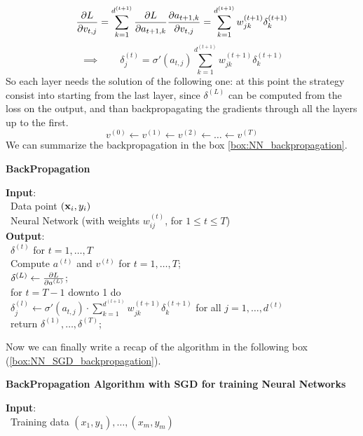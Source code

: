 \documentclass[12pt]{report}
\theoremstyle{plain}
\begin{document}
\begin{flushleft}
\[ \pdv{L}{v_{t,j}}=\sum_{k=1}^{d^{(t+1)}}\pdv{L}{a_{t+1,k}}\pdv{a_{t+1,k}}{v_{t,j}} = \sum_{k=1}^{d^{(t+1)}}w_{jk}^{(t+1)}\delta_k^{(t+1)} \]
\[ \implies\qquad\delta_j^{(t)}=\sigma'(a_{t,j})\sum_{k=1}^{d^{(t+1)}}w_{jk}^{(t+1)}\delta_k^{(t+1)} \]
So each layer needs the solution of the following one: at this point the strategy consist into starting from the last layer, since $\delta^{(L)}$ can be computed from the loss on the output, and than backpropagating the gradients through all the layers up to the first.
\[ v^{(0)}\leftarrow v^{(1)}\leftarrow v^{(2)}\leftarrow \dots \leftarrow v^{(T)} \] 
We can summarize the backpropagation in the box \ref{box:NN_backpropagation}.
\begin{tcolorbox}
	\begin{center}
		\textbf{BackPropagation}
	\end{center}
	\textbf{Input}:\\
	\-\ \quad Data point $(\vb{x}_i,y_i)$\\
	\-\ \quad Neural Network (with weights $w_{ij}^{(t)}$, for $1\leq t\leq T$)\\
	
	\textbf{Output}:\\
	\-\ \quad $\delta^{(t)}$ for $t=1,\dots,T$\\
	\-\ \quad Compute $a^{(t)}$ and $v^{(t)}$ for $t=1,\dots,T$;\\
	\-\ \quad $\delta^{(L)}\leftarrow\pdv{L}{a^{(L)}}$;\\
	\-\ \quad for $t=T-1$ downto 1 do\\
	\-\ \qquad\quad $\delta_j^{(l)}\leftarrow\sigma'(a_{t,j})\cdot\sum_{k=1}^{d^{(l+1)}}w_{jk}^{(t+1)}\delta_k^{(t+1)}$ for all $j=1,\dots,d^{(t)}$\\
	\-\ \quad return $\delta^{(1)},\dots,\delta^{(T)}$;
	
	\label{box:NN_backpropagation}
\end{tcolorbox}
Now we can finally write a recap of the algorithm in the following box (\ref{box:NN_SGD_backpropagation}).
\begin{tcolorbox}
	\begin{center}
		\textbf{BackPropagation Algorithm with SGD for training Neural Networks}
	\end{center}
	\textbf{Input}:\\
	\-\ \quad Training data $(x_1,y_1),\dots,(x_m,y_m)$\\
	

\end{tcolorbox}
\end{flushleft}
\end{document}
